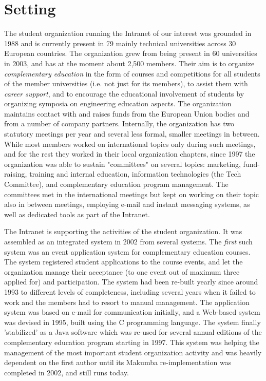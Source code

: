 \documentclass{sig-alt-release2}
\begin{document}

\section{Setting}\label{sec:setting}
The student organization running the Intranet of our interest was grounded in 1988 and is currently present in 79 mainly technical universities across 30 European countries. The organization grew from being present in 60 universities in 2003, and has at the moment about 2,500 members. Their aim is to organize {\it complementary education} in the form of courses and competitions for all students of the member universities (i.e. not just for its members), to assist them with {\it career support}, and to encourage the educational involvement of students by organizing symposia on engineering education aspects.
The organization maintains contact with and raises funds from the European Union bodies and from a number of company partners. Internally, the organization has two statutory meetings per year and several less formal, smaller meetings in between. While most members worked on international topics only during such meetings, and for the rest they worked in their local organization chapters, since 1997 the organization was able to sustain "committees" on several topics: marketing, fund-raising, training and internal education, information technologies (the Tech Committee), and complementary education program management. The committees met in the international meetings but kept on working on their topic also in between meetings, employing e-mail and instant messaging systems, as well as dedicated tools as part of the Intranet.

The Intranet is supporting the activities of the student organization. It was assembled as an integrated system in 2002 from several systems. The {\it first} such system was an event application system for complementary education courses. The system registered student applications to the course events, and let the organization manage their acceptance (to one event out of maximum three applied for) and participation. The system had been re-built yearly since around 1993 to different levels of completeness, including several years when it failed to work and the members had to resort to manual management. The application system was based on e-mail for communication initially, and a Web-based system was devised in 1995, built using the C programming language. The system finally 'stabilized' as a Java software which was re-used for several annual editions of the complementary education program starting in 1997. This system was helping the management of the most important student organization activity and was heavily dependent on the first author until its Makumba re-implementation was completed in 2002, and still runs today.
\end{document}
